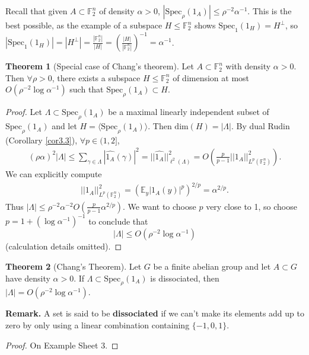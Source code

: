\documentclass{article}
\theoremstyle{definition}
\newtheorem{theorem}{Theorem}[section]
\begin{document}
Recall that given $A \subset \mathbb{F}_2^n$ of density $\alpha>0$, $\left|\text{Spec}_{\rho}(1_A)\right| \le \rho^{-2}\alpha^{-1}$. This is the best possible, as the example of a subspace $H \le \mathbb{F}_2^n$ shows $\text{Spec}_1(1_H) = H^\perp$, so $\left|\text{Spec}_1(1_H)\right| = \left|H^\perp\right| = \frac{\left|\mathbb{F}_2^n\right|}{\left|H\right|} = \left(\frac{\left|H\right|}{\left|\mathbb{F}_2^n\right|}\right)^{-1} = \alpha^{-1}$.
\begin{theorem}[Special case of Chang's theorem]\label{theorem3.4}
    Let $A \subset \mathbb{F}_2^n$ with density $\alpha>0$. Then $\forall \rho>0$, there exists a subspace $H \le \mathbb{F}_2^n$ of dimension at most $O \left(\rho^{-2} \log \alpha^{-1}\right)$ such that $\text{Spec}_{\rho}(1_A) \subset H$.
\end{theorem}
\begin{proof}
    Let $\Lambda \subset \text{Spec}_{\rho}(1_A)$ be a maximal linearly independent subset of $\text{Spec}_{\rho}(1_A)$ and let $H = \langle \text{Spec}_\rho (1_A)\rangle$. Then $\text{dim}(H) = \left|\Lambda\right|$. By dual Rudin (Corollary \ref{cor3.3}), $\forall p \in (1,2]$,
    \begin{align*}
        (\rho \alpha)^2 \left|\Lambda\right| \le \sum_{\gamma \in \Lambda}^{} \left|\widehat{1_A}(\gamma)\right|^2 = ||\widehat{1_A}||^2_{\ell^2(\Lambda)} = O \left( \frac{p}{p-1} ||1_A||^2_{L^p(\mathbb{F}_2^n)}\right).
    \end{align*}
    We can explicitly compute 
    \begin{align*}
        ||1_A||^2_{L^p(\mathbb{F}_2^n)} = \left(\mathbb{E}_y |1_A(y)|^p \right)^{2/p} = \alpha^{2/p}.
    \end{align*}
    Thus $\left|\Lambda\right| \le \rho^{-2}\alpha^{-2} O \left(\frac{p}{p-1} \alpha^{2/p}\right)$. We want to choose $p$ very close to 1, so choose $p = 1 + \left(\log \alpha ^{-1}\right)^{-1}$ to conclude that \[
    \left|\Lambda\right|\le O \left(\rho^{-2}\log \alpha^{-1} \right)
    \]
    (calculation details omitted).
\end{proof}
\begin{theorem}[Chang's Theorem]\label{theorem3.6}
    Let $G$ be a finite abelian group and let $A \subset G$ have density $\alpha>0$. If $\Lambda \subset \text{Spec}_{\rho}(1_A)$ is dissociated, then $\left|\Lambda\right| = O \left(\rho^{-2}\log \alpha ^{-1}\right)$.
\end{theorem}
\textbf{Remark.} A set is said to be \textbf{dissociated} if we can't make its elements add up to zero by only using a linear combination containing $\{-1,0,1\}$.
\begin{proof}
    On Example Sheet 3.
\end{proof}
\end{document}
